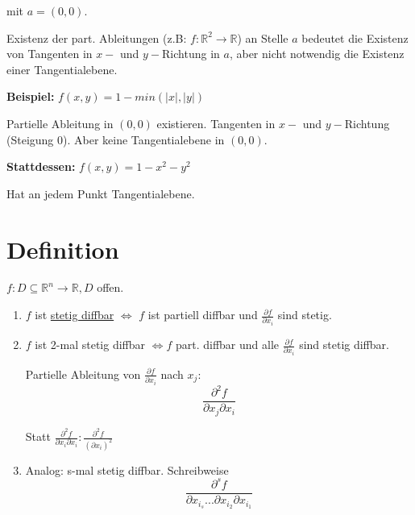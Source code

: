 \documentclass[a4paper, openany]{book}
\begin{document}
          mit $a = (0,0)$.

          \par \medskip

          Existenz der part. Ableitungen (z.B: $f: \mathbb{R}^2 \rightarrow \mathbb{R}$) an Stelle $a$ bedeutet die Existenz von Tangenten in $x-$ und $y-$Richtung in $a$, aber nicht notwendig die Existenz einer Tangentialebene.

          \par \medskip

          \textbf{Beispiel:} $f(x,y) = 1- min(|x|, |y|)$

          Partielle Ableitung in $(0,0)$ existieren. Tangenten in $x-$ und $y-$Richtung (Steigung 0). Aber keine Tangentialebene in $(0,0)$.

          \par \medskip

          \textbf{Stattdessen:} $f(x,y) = 1-x^2-y^2$

          Hat an jedem Punkt Tangentialebene.

          \section{Definition}

          $f : D \subseteq \mathbb{R}^n \rightarrow \mathbb{R}, D$ offen.

          \begin{enumerate}[label=(\alph*)]
            \item $f$ ist \underline{stetig diffbar} $\Leftrightarrow$ $f$ ist partiell diffbar und $\frac{\partial f}{\partial x_i}$ sind stetig.

            \item $f$ ist 2-mal stetig diffbar $\Leftrightarrow f$ part. diffbar und alle $\frac{\partial f}{\partial x_i}$ sind stetig diffbar.

            \par \medskip

             Partielle Ableitung von $\frac{\partial f}{\partial x_i}$ nach $x_j$: \[ \frac{\partial^2 f}{\partial x_j \partial x_i} \]

            Statt $\frac{\partial^2 f}{\partial x_i \partial x_i}: \frac{\partial^2 f}{(\partial x_i)^2}$

            \item Analog: s-mal stetig diffbar. Schreibweise \[ \frac{\partial^s f}{\partial x_{i_s} ... \partial x_{i_2} \partial x_{i_1}} \]
          \end{enumerate}
\end{document}
